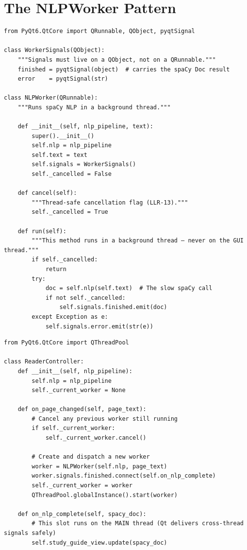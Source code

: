 \documentclass[12pt,oneside]{book}
\begin{document}
\section{The NLPWorker Pattern}

\begin{lstlisting}[caption={The NLPWorker class (LLR-10, LLR-11, LLR-12)}]
from PyQt6.QtCore import QRunnable, QObject, pyqtSignal

class WorkerSignals(QObject):
    """Signals must live on a QObject, not on a QRunnable."""
    finished = pyqtSignal(object)  # carries the spaCy Doc result
    error    = pyqtSignal(str)

class NLPWorker(QRunnable):
    """Runs spaCy NLP in a background thread."""

    def __init__(self, nlp_pipeline, text):
        super().__init__()
        self.nlp = nlp_pipeline
        self.text = text
        self.signals = WorkerSignals()
        self._cancelled = False

    def cancel(self):
        """Thread-safe cancellation flag (LLR-13)."""
        self._cancelled = True

    def run(self):
        """This method runs in a background thread — never on the GUI thread."""
        if self._cancelled:
            return
        try:
            doc = self.nlp(self.text)  # The slow spaCy call
            if not self._cancelled:
                self.signals.finished.emit(doc)
        except Exception as e:
            self.signals.error.emit(str(e))
\end{lstlisting}

\begin{lstlisting}[caption={Dispatching the worker from the Controller (LLR-12, LLR-13)}]
from PyQt6.QtCore import QThreadPool

class ReaderController:
    def __init__(self, nlp_pipeline):
        self.nlp = nlp_pipeline
        self._current_worker = None

    def on_page_changed(self, page_text):
        # Cancel any previous worker still running
        if self._current_worker:
            self._current_worker.cancel()

        # Create and dispatch a new worker
        worker = NLPWorker(self.nlp, page_text)
        worker.signals.finished.connect(self.on_nlp_complete)
        self._current_worker = worker
        QThreadPool.globalInstance().start(worker)

    def on_nlp_complete(self, spacy_doc):
        # This slot runs on the MAIN thread (Qt delivers cross-thread signals safely)
        self.study_guide_view.update(spacy_doc)
\end{lstlisting}
\end{document}
